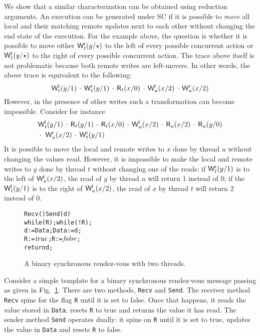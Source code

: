 \documentclass[preprint,9pt]{sigplanconf}
\begin{document}
We show that a similar characterization can be obtained using reduction arguments.
An execution can be generated under SC if it is possible to {\em move} all local and their matching remote updates next to each other without changing the end state of the execution.
For the example above, the question is whether it is possible to move either $\mathsf{W}^{\mathsf{r}}_{t}(y/\star)$ to the left of every possible concurrent action or $\mathsf{W}^{\mathsf{l}}_{t}(y/\star)$ to the right of every possible concurrent action.
The trace above itself is not problematic because both remote writes are left-movers. 
In other words, the above trace is equivalent to the following:
\[
{\mathsf{W}^{\mathsf{l}}_{t}(y/1)}\,\cdot\,{\mathsf{W}^{\mathsf{r}}_{t}(y/1)}\,\cdot\,{\mathsf{R}_{t}(x/0)}\,\cdot\,{\mathsf{W}^{\mathsf{l}}_{u}(x/2)}\,\cdot\,{\mathsf{W}^{\mathsf{r}}_{u}(x/2)}
\]
However, in the presence of other writes such a transformation can become impossible.
Consider for instance
\begin{eqnarray*}
&{\mathsf{W}^{\mathsf{l}}_{t}(y/1)}\,\cdot\,{\mathsf{R}_{t}(y/1)}\,\cdot\,{\mathsf{R}_{t}(x/0)}\,\cdot\,{\mathsf{W}^{\mathsf{l}}_{u}(x/2)}\,\cdot\,{\mathsf{R}_{u}(x/2)}\,\cdot\,{\mathsf{R}_{u}(y/0)}\\
&\cdot\ {\mathsf{W}^{\mathsf{r}}_{u}(x/2)}\,\cdot\,{\mathsf{W}^{\mathsf{r}}_{t}(y/1)}
\end{eqnarray*}
It is possible to move the local and remote writes to $x$ done by thread $u$ without changing the values read.
However, it is impossible to make the local and remote writes to $y$ done by thread $t$ without changing one of the reads: if $\mathsf{W}^{\mathsf{r}}_{t}(y/1)$ is to the left of $\mathsf{W}^{\mathsf{l}}_{u}(x/2)$, the read of $y$ by thread $u$ will return 1 instead of 0; if the $\mathsf{W}^{\mathsf{l}}_{t}(y/1)$ is to the right of $\mathsf{W}^{\mathsf{l}}_{u}(x/2)$, the read of $x$ by thread $t$ will return 2 instead of 0.

\begin{figure}[t]
\begin{alltt}
Recv()          Send(d)
 while (R);      while (!R);
 d := Data;      Data := d;
 R := \(\alitrue\);       R := \(\alifalse\);
 return d;\end{alltt}
\caption{A binary synchronous rendez-vous with two threads.}
\label{fig:rendez-vous}
\end{figure}
Consider a simple template for a binary synchronous rendez-vous message passing as given in Fig.~\ref{fig:rendez-vous}.
There are two methods, {\tt Recv} and {\tt Send}.
The receiver method {\tt Recv} spins for the flag {\tt R} until it is set to false.
Once that happens, it reads the value stored in {\tt Data}, resets {\tt R} to true and returns the value it has read.
The sender method {\tt Send} operates dually: it spins on {\tt R} until it is set to true, updates the value in {\tt Data} and resets {\tt R} to false.
\end{document}
